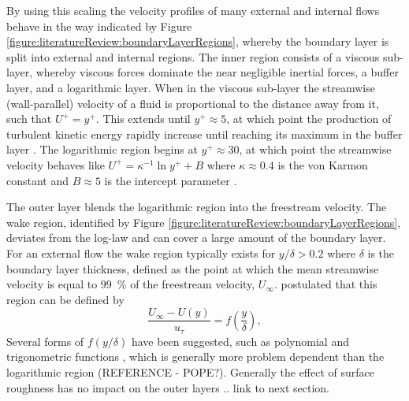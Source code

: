 \documentclass[12pt,oneside,a4paper]{article}
\begin{document}
By using this scaling the velocity profiles of many external and internal flows behave in the way indicated by Figure \ref{figure:literatureReview:boundaryLayerRegions}, whereby the boundary layer is split into external and internal regions. The inner region consists of a viscous sub-layer, whereby viscous forces dominate the near negligible inertial forces, a buffer layer, and a logarithmic layer. When in the viscous sub-layer the streamwise (wall-parallel) velocity of a fluid is proportional to the distance away from it, such that $U^+ = y^+$. This extends until $y^+ \approx 5$, at which point the production of turbulent kinetic energy rapidly increase until reaching its maximum in the buffer layer \citep{perlin2016}. The logarithmic region begins at $y^+ \approx 30$, at which point the streamwise velocity behaves like $U^+ = \kappa^{-1} \ln{y^+} + B$ where $\kappa \approx 0.4$ is the von Karmon constant and $B\approx 5$ is the intercept parameter \citep{pope2001}.

The outer layer blends the logarithmic region into the freestream velocity. The wake region, identified by Figure \ref{figure:literatureReview:boundaryLayerRegions}, deviates from the log-law and can cover a large amount of the boundary layer. For an external flow the wake region typically exists for $y/\delta > 0.2$ where $\delta$ is the boundary layer thickness, defined as the point at which the mean streamwise velocity is equal to \SI{99}{\%} of the freestream velocity, $U_\infty$. \cite{coles1956} postulated that this region can be defined by
\begin{equation}
\frac{U_\infty - U(y)}{u_\tau} = f \left( \frac{y}{\delta} \right),
\end{equation}
Several forms of $f(y/\delta)$ have been suggested, such as polynomial and trigonometric functions \citep{perlin2016}, which is generally more problem dependent than the logarithmic region (REFERENCE - POPE?). Generally the effect of surface roughness has no impact on the outer layers .. link to next section.
\end{document}
